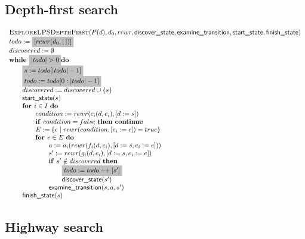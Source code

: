 \documentclass{article}
\newcommand{\concat}{\ensuremath{+\!\!+\:}}
\newcommand{\Space}{\text{\ }}
\newcommand{\If}{\text{\textbf{if }}}
\newcommand{\Do}{\text{\textbf{do }}}
\newcommand{\Then}{\text{\textbf{then }}}
\newcommand{\For}{\text{\textbf{for }}}
\newcommand{\While}{\text{\textbf{while }}}
\newcommand{\Continue}{\text{\textbf{continue }}}
\begin{document}
\subsection{Depth-first search}
\[
\begin{tabular}{l}
\textsc{ExploreLPSDepthFirst}($P(d), d_0, rewr, \textsf{discover\_state}, \textsf{examine\_transition},
\textsf{start\_state}, \textsf{finish\_state})$ \\
$todo := \colorbox{lightgray}{$[rewr(d_0, [\:])]$}$ \\
$discovered := \emptyset$ \\
$\While \colorbox{lightgray}{$|todo| > 0$} \Do$ \\
\qquad \colorbox{lightgray}{$s := todo[|todo| - 1]$} \\
\qquad \colorbox{lightgray}{$todo := todo[0:|todo| - 1]$} \\
\qquad $discovered := discovered \cup \{s\}$ \\
\qquad $\textsf{start\_state}(s)$ \\
\qquad $\For i \in I  \Space \Do$ \\
\qquad \qquad $condition := rewr(c_i(d, e_i), [d := s])$ \\
\qquad \qquad $\If condition = false  \Space \Then \Continue$ \\
\qquad \qquad $E := \{ e \mid rewr(condition, [e_i := e]) = true \}$ \\
\qquad \qquad $\For e \in E  \Space \Do$ \\
\qquad \qquad \qquad $a := a_i(rewr(f_i(d,e_i), [d:=s,e_i:=e]))$ \\
\qquad \qquad \qquad $s' := rewr(g_i(d,e_i), [d:=s,e_i:=e])$ \\
\qquad \qquad \qquad $\If s' \notin discovered \Space \Then$ \\
\qquad \qquad \qquad \qquad \colorbox{lightgray}{$todo := todo \concat [s']$} \\
\qquad \qquad \qquad \qquad $\textsf{discover\_state}(s')$ \\
\qquad \qquad \qquad $\textsf{examine\_transition}(s, a, s')$ \\
\qquad $\textsf{finish\_state}(s)$ \\
\end{tabular}
\]

\newpage
\subsection{Highway search}
\end{document}
